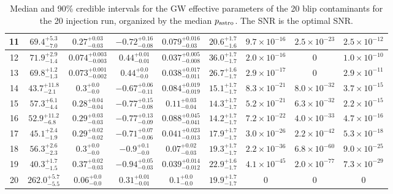 \begin{refsection}
\begin{table}
{\begin{tabular}{|c|c|c|c|c|c|c|c|c|}
 \\ \hline 11 & $69.4^{+5.3}_{-7.0}$ & $0.27^{+0.03}_{-0.03}$ & $-0.72^{+0.16}_{-0.08}$ & $0.079^{+0.016}_{-0.03}$ & $20.6^{+1.7}_{-1.6}$ & $9.7\times 10^{-16}$ & $2.5\times 10^{-23}$ & $2.5\times 10^{-12}$ 
 \\ \hline 12 & $71.9^{+2.9}_{-1.4}$ & $0.074^{+0.003}_{-0.003}$ & $0.44^{+0.01}_{-0.01}$ & $0.037^{+0.005}_{-0.008}$ & $36.0^{+1.7}_{-1.7}$ & $2.0\times 10^{-16}$ & $0$ & $1.0\times 10^{-10}$ 
 \\ \hline 13 & $69.8^{+1.2}_{-1.3}$ & $0.073^{+0.001}_{-0.002}$ & $0.44^{+0.0}_{-0.0}$ & $0.038^{+0.017}_{-0.011}$ & $26.7^{+1.6}_{-1.7}$ & $2.9\times 10^{-17}$ & $0$ & $2.9\times 10^{-11}$ 
 \\ \hline 14 & $43.7^{+11.8}_{-2.1}$ & $0.3^{+0.0}_{-0.0}$ & $-0.67^{+0.06}_{-0.11}$ & $0.084^{+0.019}_{-0.019}$ & $15.1^{+1.7}_{-1.7}$ & $8.3\times 10^{-21}$ & $8.0\times 10^{-32}$ & $3.7\times 10^{-15}$ 
 \\ \hline 15 & $57.3^{+6.1}_{-4.4}$ & $0.28^{+0.04}_{-0.04}$ & $-0.77^{+0.15}_{-0.08}$ & $0.11^{+0.03}_{-0.04}$ & $14.3^{+1.7}_{-1.7}$ & $5.2\times 10^{-21}$ & $6.3\times 10^{-32}$ & $2.2\times 10^{-15}$ 
 \\ \hline 16 & $52.9^{+11.2}_{-6.8}$ & $0.29^{+0.03}_{-0.03}$ & $-0.77^{+0.13}_{-0.09}$ & $0.088^{+0.045}_{-0.041}$ & $14.2^{+1.7}_{-1.7}$ & $7.2\times 10^{-22}$ & $4.0\times 10^{-33}$ & $4.7\times 10^{-16}$ 
 \\ \hline 17 & $45.1^{+2.4}_{-1.9}$ & $0.29^{+0.02}_{-0.02}$ & $-0.71^{+0.07}_{-0.06}$ & $0.041^{+0.023}_{-0.013}$ & $17.9^{+1.7}_{-1.7}$ & $3.0\times 10^{-26}$ & $2.2\times 10^{-42}$ & $5.3\times 10^{-18}$ 
 \\ \hline 18 & $56.3^{+2.6}_{-2.3}$ & $0.3^{+0.0}_{-0.0}$ & $-0.9^{+0.1}_{-0.0}$ & $0.07^{+0.02}_{-0.03}$ & $19.3^{+1.7}_{-1.7}$ & $2.2\times 10^{-36}$ & $6.8\times 10^{-60}$ & $9.0\times 10^{-25}$ 
 \\ \hline 19 & $40.3^{+1.7}_{-1.5}$ & $0.37^{+0.02}_{-0.03}$ & $-0.94^{+0.05}_{-0.03}$ & $0.039^{+0.014}_{-0.012}$ & $22.9^{+1.6}_{-1.7}$ & $4.1\times 10^{-45}$ & $2.0\times 10^{-77}$ & $7.3\times 10^{-29}$ 
 \\ \hline 20 & $262.0^{+5.7}_{-5.5}$ & $0.06^{+0.0}_{-0.0}$ & $0.31^{+0.01}_{-0.01}$ & $0.1^{+0.0}_{-0.0}$ & $19.9^{+1.7}_{-1.7}$ & $0$ & $0$ & $0$ 
 \\ \hline
    \end{tabular}}
    \caption{Median and 90\% credible intervals for the GW effective parameters of the 20 blip contaminants for the 20 injection run, organized by the median $p_{\rm astro}$. The SNR is the optimal SNR.}
    \label{tab:blip_params}
\end{table}


\end{refsection}
